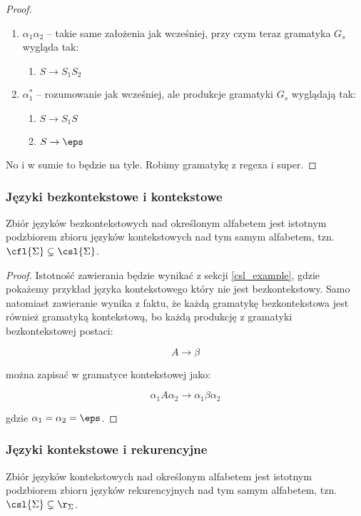 \begin{proof}
\begin{enumerate}
		\item \( \alpha_1 \alpha_2\) -- takie same założenia jak wcześniej, przy czym teraz gramatyka \(G_s\) wygląda tak:

		      \begin{enumerate}
			      \item \(S \rightarrow S_1S_2\)
		      \end{enumerate}

		\item \( \alpha_1^*\) -- rozumowanie jak wcześniej, ale produkcje gramatyki \(G_s\) wyglądają tak:

		      \begin{enumerate}
			      \item \( S \rightarrow S_1S\)
			      \item \( S \rightarrow \eps \)
		      \end{enumerate}
	\end{enumerate}
	No i w sumie to będzie na tyle. Robimy gramatykę z regexa i super.
\end{proof}

\subsubsection{Języki bezkontekstowe i kontekstowe}

\begin{theorem}
	Zbiór języków bezkontekstowych nad określonym alfabetem jest istotnym podzbiorem zbioru języków kontekstowych nad tym samym alfabetem, tzn. \(\cfl{\Sigma} \subsetneq \csl{\Sigma}\).
\end{theorem}

\begin{proof}
	Istotność zawierania będzie wynikać z sekcji \ref{csl_example}, gdzie pokażemy przykład języka kontekstowego który nie jest bezkontekstowy. Samo natomiast zawieranie wynika z faktu, że każdą gramatykę bezkontekstowa jest również gramatyką kontekstową, bo każdą produkcję z gramatyki bezkontekstowej postaci:

	\[
		A \rightarrow \beta
	\]

	można zapisać w gramatyce kontekstowej jako:

	\[
		\alpha_1 A \alpha_2 \rightarrow \alpha_1 \beta \alpha_2
	\]

	gdzie \(\alpha_1 = \alpha_2 = \eps\).
\end{proof}

\subsubsection{Języki kontekstowe i rekurencyjne}
\begin{theorem}
	Zbiór języków kontekstowych nad określonym alfabetem jest istotnym podzbiorem zbioru języków rekurencyjnych nad tym samym alfabetem, tzn. \(\csl{\Sigma} \subsetneq \r_{\Sigma}\).
\end{theorem}

